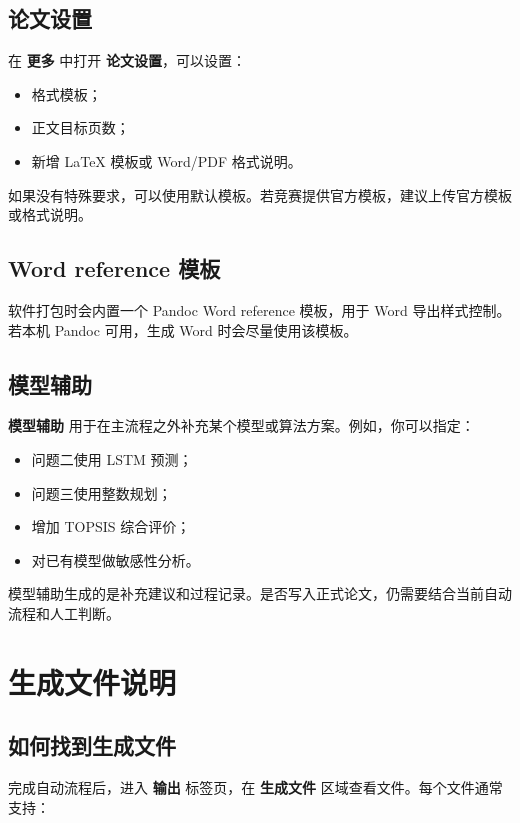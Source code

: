 \documentclass[UTF8,a4paper,12pt]{ctexart}
\newcommand{\menu}[1]{\textbf{#1}}
\begin{document}
\subsection{论文设置}

在 \menu{更多} 中打开 \menu{论文设置}，可以设置：

\begin{itemize}
  \item 格式模板；
  \item 正文目标页数；
  \item 新增 LaTeX 模板或 Word/PDF 格式说明。
\end{itemize}

如果没有特殊要求，可以使用默认模板。若竞赛提供官方模板，建议上传官方模板或格式说明。

\subsection{Word reference 模板}

软件打包时会内置一个 Pandoc Word reference 模板，用于 Word 导出样式控制。若本机 Pandoc 可用，生成 Word 时会尽量使用该模板。

\subsection{模型辅助}

\menu{模型辅助} 用于在主流程之外补充某个模型或算法方案。例如，你可以指定：

\begin{itemize}
  \item 问题二使用 LSTM 预测；
  \item 问题三使用整数规划；
  \item 增加 TOPSIS 综合评价；
  \item 对已有模型做敏感性分析。
\end{itemize}

模型辅助生成的是补充建议和过程记录。是否写入正式论文，仍需要结合当前自动流程和人工判断。

\section{生成文件说明}

\subsection{如何找到生成文件}

完成自动流程后，进入 \menu{输出} 标签页，在 \menu{生成文件} 区域查看文件。每个文件通常支持：
\end{document}
